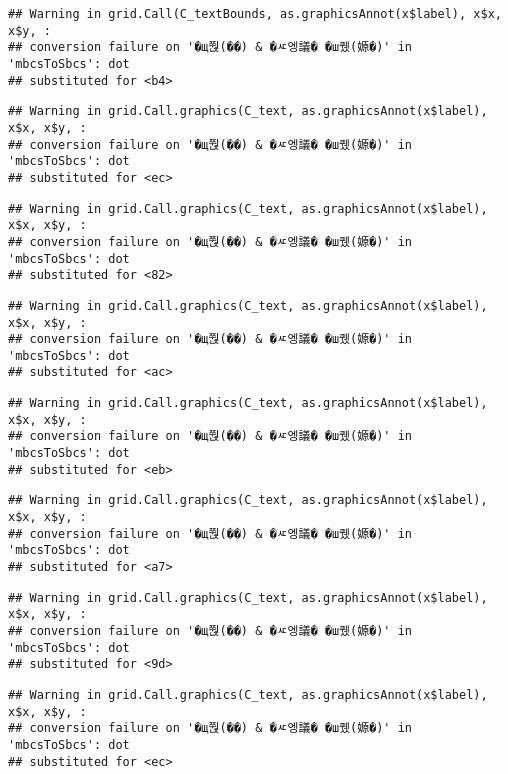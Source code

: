 \documentclass[
]{article}
\begin{document}
\begin{verbatim}
## Warning in grid.Call(C_textBounds, as.graphicsAnnot(x$label), x$x, x$y, :
## conversion failure on '�щ쭩(��) & �ㅼ엥議� �ш퀬(嫄�)' in 'mbcsToSbcs': dot
## substituted for <b4>
\end{verbatim}

\begin{verbatim}
## Warning in grid.Call.graphics(C_text, as.graphicsAnnot(x$label), x$x, x$y, :
## conversion failure on '�щ쭩(��) & �ㅼ엥議� �ш퀬(嫄�)' in 'mbcsToSbcs': dot
## substituted for <ec>
\end{verbatim}

\begin{verbatim}
## Warning in grid.Call.graphics(C_text, as.graphicsAnnot(x$label), x$x, x$y, :
## conversion failure on '�щ쭩(��) & �ㅼ엥議� �ш퀬(嫄�)' in 'mbcsToSbcs': dot
## substituted for <82>
\end{verbatim}

\begin{verbatim}
## Warning in grid.Call.graphics(C_text, as.graphicsAnnot(x$label), x$x, x$y, :
## conversion failure on '�щ쭩(��) & �ㅼ엥議� �ш퀬(嫄�)' in 'mbcsToSbcs': dot
## substituted for <ac>
\end{verbatim}

\begin{verbatim}
## Warning in grid.Call.graphics(C_text, as.graphicsAnnot(x$label), x$x, x$y, :
## conversion failure on '�щ쭩(��) & �ㅼ엥議� �ш퀬(嫄�)' in 'mbcsToSbcs': dot
## substituted for <eb>
\end{verbatim}

\begin{verbatim}
## Warning in grid.Call.graphics(C_text, as.graphicsAnnot(x$label), x$x, x$y, :
## conversion failure on '�щ쭩(��) & �ㅼ엥議� �ш퀬(嫄�)' in 'mbcsToSbcs': dot
## substituted for <a7>
\end{verbatim}

\begin{verbatim}
## Warning in grid.Call.graphics(C_text, as.graphicsAnnot(x$label), x$x, x$y, :
## conversion failure on '�щ쭩(��) & �ㅼ엥議� �ш퀬(嫄�)' in 'mbcsToSbcs': dot
## substituted for <9d>
\end{verbatim}

\begin{verbatim}
## Warning in grid.Call.graphics(C_text, as.graphicsAnnot(x$label), x$x, x$y, :
## conversion failure on '�щ쭩(��) & �ㅼ엥議� �ш퀬(嫄�)' in 'mbcsToSbcs': dot
## substituted for <ec>
\end{verbatim}
\end{document}

